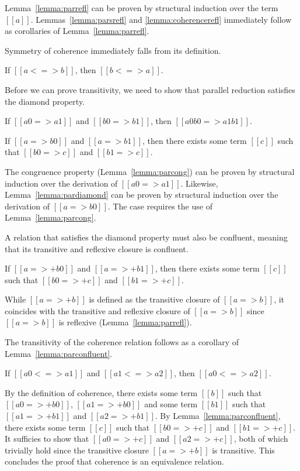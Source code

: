 \documentclass[nonacm]{acmart}
\begin{document}
Lemma~\ref{lemma:parrefl} can be proven by structural induction over
the term $[[a]]$. Lemmas~\ref{lemma:parsrefl} and \ref{lemma:coherencerefl}
immediately follow as corollaries of Lemma~\ref{lemma:parrefl}.

Symmetry of coherence immediately falls from its definition.
\begin{lemma}
  \label{lemma:coherencesym}
  If $[[a <=> b]]$, then $[[b <=> a]]$.
\end{lemma}

Before we can prove transitivity, we need to show that parallel
reduction satisfies the diamond property.
\begin{lemma}
  \label{lemma:parcong}
  If $[[a0 => a1]]$ and $[[b0 => b1]]$, then $[[a0 { b0 } => a1 { b1 }]]$.
\end{lemma}
\begin{lemma}
  \label{lemma:pardiamond}
  If $[[a => b0]]$ and $[[a => b1]]$, then there exists some term
  $[[c]]$ such that $[[b0 => c]]$ and $[[b1 => c]]$.
\end{lemma}
The congruence property (Lemma~\ref{lemma:parcong}) can be proven by
structural induction over the derivation of $[[a0 => a1]]$.
Likewise, Lemma~\ref{lemma:pardiamond} can be proven by structural induction
over the derivation of $[[a => b0]]$. The  case requires
the use of Lemma~\ref{lemma:parcong}.

A relation that satisfies the
diamond property must also be confluent, meaning that its transitive
and reflexive closure is confluent.
\begin{lemma}
  \label{lemma:parconfluent}
  If $[[a =>+ b0]]$ and $[[a =>+ b1]]$, then there exists some term
  $[[c]]$ such that $[[b0 =>+ c]]$ and $[[b1 =>+ c]]$.
\end{lemma}
While $[[a =>+ b]]$ is defined as the transitive closure of $[[a => b]]$,
it coincides with the transitive and reflexive closure of $[[a => b]]$ since $[[a
=> b]]$ is reflexive (Lemma~\ref{lemma:parrefl}).

The transitivity of the coherence relation follows as a corollary of
Lemma~\ref{lemma:parconfluent}.
\begin{lemma}
  \label{lemma:coherencetrans}
  If $[[a0 <=> a1]]$ and $[[a1 <=> a2]]$, then $[[a0 <=> a2]]$.
\end{lemma}
By the definition of coherence, there exists some term $[[b]]$ such that $[[a0 =>+ b0]]$,
$[[a1 =>+ b0]]$ and some term $[[b1]]$ such that $[[a1 =>+ b1]]$ and
$[[a2 =>+ b1]]$. By Lemma~\ref{lemma:parconfluent}, there exists some
term $[[c]]$ such that $[[b0 =>+ c]]$ and $[[b1 =>+ c]]$. It sufficies
to show that $[[a0 =>+ c]]$ and $[[a2 =>+ c]]$, both of which
trivially hold since the transitive closure $[[a =>+ b]]$ is transitive.
This concludes the proof that coherence is an equivalence relation.
\end{document}
